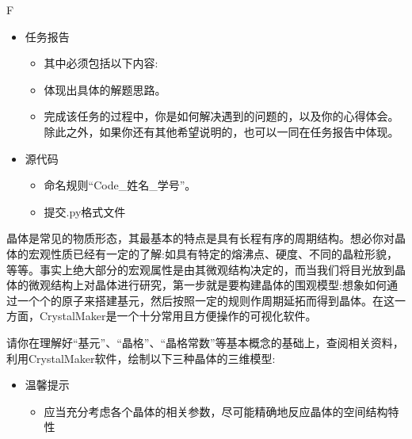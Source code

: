 \documentclass[12pt,a4paper]{article}
\begin{document}
\begin{ACEEsubmit}{F}
\begin{itemize}
	\item 任务报告
		\begin{itemize}
			\item[] 其中必须包括以下内容:
			\item[1.] 体现出具体的解题思路。
			\item[2.] 完成该任务的过程中，你是如何解决遇到的问题的，以及你的心得体会。除此之外，如果你还有其他希望说明的，也可以一同在任务报告中体现。
		\end{itemize}
	\item 源代码
		\begin{itemize}
			\item[1.] 命名规则``Code\_姓名\_学号''。 
			\item[2.] 提交.py格式文件
		\end{itemize}
\end{itemize}
\end{ACEEsubmit}
\newpage
{}
\begin{ACEEproblem}{1.4}{\xiaosihao}{\youyuan}
晶体是常见的物质形态，其最基本的特点是具有长程有序的周期结构。想必你对晶体的宏观性质已经有一定的了解:如具有特定的熔沸点、硬度、不同的晶粒形貌，等等。事实上绝大部分的宏观属性是由其微观结构决定的，而当我们将目光放到晶体的微观结构上对晶体进行研究，第一步就是要构建晶体的围观模型:想象如何通过一个个的原子来搭建基元，然后按照一定的规则作周期延拓而得到晶体。在这一方面，CrystalMaker是一个十分常用且方便操作的可视化软件。\par
请你在理解好``基元''、``晶格''、``晶格常数''等基本概念的基础上，查阅相关资料，利用CrystalMaker软件，绘制以下三种晶体的三维模型:\par

\begin{center}
{} \hspace{0.2\textwidth}     {} \hspace{0.2\textwidth}     {}
\end{center}
\vspace*{4pt}
\begin{itemize}
	\item 温馨提示
	\begin{itemize}
		\item[] 应当充分考虑各个晶体的相关参数，尽可能精确地反应晶体的空间结构特性
	\end{itemize}
\end{itemize}
\end{ACEEproblem}
\end{document}
